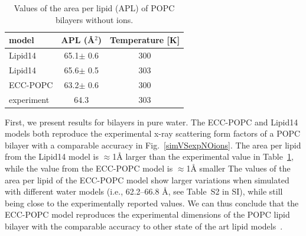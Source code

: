 \documentclass[aip,jcp,twocolumn]{revtex4}
\begin{document}
\begin{table}[tb!]
  \caption{Values of the area per lipid (APL) of POPC bilayers without ions. \label{tab:apls}
  }
  \begin{tabular}{l|c c}
    model          & APL (\AA$^2$)   & Temperature [K] \\
    \hline
    Lipid14                   & 65.1$\pm$ 0.6  &  300 \\
    Lipid14 \cite{dickson14}  & 65.6$\pm$ 0.5  &  303 \\
    \hline
    ECC-POPC                & 63.2$\pm$ 0.6  &  300       \\
    \hline
    experiment \cite{kucerka11} & 64.3  &  303    \\
    \hline
  \end{tabular}
\end{table}


First, we present results for bilayers in pure water.
The ECC-POPC and Lipid14 models both reproduce the experimental x-ray scattering form factors
of a POPC bilayer with a comparable accuracy in Fig.~\ref{simVSexpNOions}.
The area per lipid from the Lipid14 model is $\approx$1\AA{} larger than the
experimental value in Table~\ref{tab:apls}, while the value from the ECC-POPC model
is $\approx$1\AA{} smaller
The values of the area per lipid of the ECC-POPC model show larger variations
when simulated with different water models (i.e., 62.2--66.8 \AA{}, see Table~S2 in SI),
while still being close to the experimentally reported values.
We can thus conclude that the ECC-POPC model reproduces the experimental dimensions of the POPC
lipid bilayer with the comparable accuracy to other state of the art lipid models~\cite{ollila16}.
\end{document}
